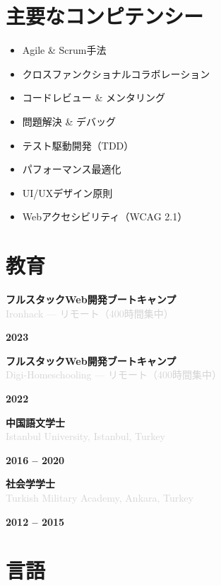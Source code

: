 \documentclass[10pt,a4paper]{article}
\newcommand{\Education}[3]{%
  \vspace{2pt}
  \noindent
  \begin{minipage}[t]{0.70\textwidth}
    {\normalsize\textbf{\color{darkgray}#1}} \\
    \textcolor{lightgray}{\small #2}
  \end{minipage}%
  \hfill
  \begin{minipage}[t]{0.28\textwidth}
    \raggedleft
    \textcolor{mediumgray}{\small\textbf{#3}}
  \end{minipage}
  \vspace{1pt}
}
\begin{document}
\section*{主要なコンピテンシー}

\noindent
\begin{minipage}[t]{0.48\textwidth}
  \begin{itemize}
    \item Agile \& Scrum手法
    \item クロスファンクショナルコラボレーション
    \item コードレビュー \& メンタリング
    \item 問題解決 \& デバッグ
  \end{itemize}
\end{minipage}%
\hfill
\begin{minipage}[t]{0.48\textwidth}
  \begin{itemize}
    \item テスト駆動開発（TDD）
    \item パフォーマンス最適化
    \item UI/UXデザイン原則
    \item Webアクセシビリティ（WCAG 2.1）
  \end{itemize}
\end{minipage}

\section*{教育}

\Education{フルスタックWeb開発ブートキャンプ}{Ironhack — リモート（400時間集中）}{2023}

\Education{フルスタックWeb開発ブートキャンプ}{Digi-Homeschooling — リモート（400時間集中）}{2022}

\Education{中国語文学士}{Istanbul University, Istanbul, Turkey}{2016 -- 2020}

\Education{社会学学士}{Turkish Military Academy, Ankara, Turkey}{2012 -- 2015}

\section*{言語}
\end{document}
